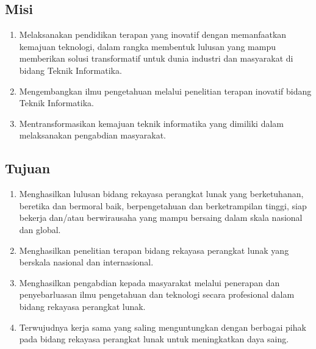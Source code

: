 \subsection{Misi}
\begin{enumerate}
\item Melaksanakan pendidikan terapan yang inovatif dengan memanfaatkan kemajuan teknologi, dalam rangka membentuk lulusan yang mampu memberikan solusi transformatif untuk dunia industri dan masyarakat di bidang Teknik Informatika.
\item Mengembangkan ilmu pengetahuan melalui penelitian terapan inovatif bidang Teknik Informatika.
\item Mentransformasikan kemajuan teknik informatika yang dimiliki dalam melaksanakan pengabdian masyarakat.
\end{enumerate}

\subsection{Tujuan}
\begin{enumerate}
\item Menghasilkan lulusan bidang rekayasa perangkat lunak yang berketuhanan, beretika dan bermoral baik, berpengetahuan dan berketrampilan tinggi, siap bekerja dan/atau berwirausaha yang mampu bersaing dalam skala nasional dan global.
\item Menghasilkan penelitian terapan bidang rekayasa perangkat lunak yang berskala nasional dan internasional.
\item Menghasilkan pengabdian kepada masyarakat melalui penerapan dan penyebarluasan ilmu pengetahuan dan teknologi secara profesional dalam bidang rekayasa perangkat lunak.
\item Terwujudnya kerja sama yang saling menguntungkan dengan berbagai pihak pada bidang rekayasa perangkat lunak untuk meningkatkan daya saing.
\end{enumerate}
